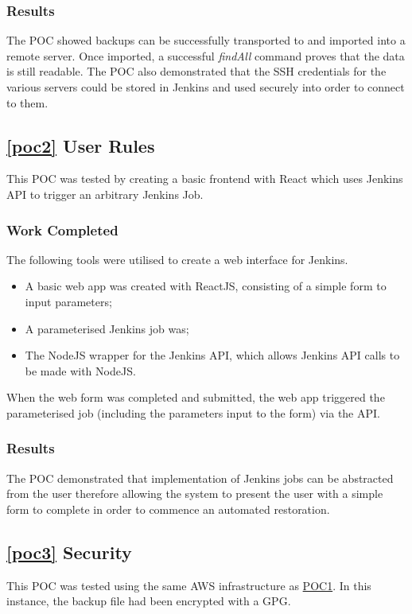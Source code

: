 	\subsubsection{Results}
  The POC showed backups can be successfully transported to and imported into a remote server. Once imported, a successful \textit{findAll} command proves that the data is still readable. The POC also demonstrated that the SSH credentials for the various servers could be stored in Jenkins and used securely into order to connect to them.
  
\subsection{\ref{poc2} User Rules}
	This POC was tested by creating a basic frontend with React which uses Jenkins API to trigger an arbitrary Jenkins Job.
	
	\subsubsection{Work Completed}
  The following tools were utilised to create a web interface for Jenkins.
  \begin{itemize}
    \item A basic web app was created with ReactJS, consisting of a simple form to input parameters;
    \item A parameterised Jenkins job was;
    \item The NodeJS wrapper for the Jenkins API, which allows Jenkins API calls to be made with NodeJS.
  \end{itemize}
  When the web form was completed and submitted, the web app triggered the parameterised job (including the parameters input to the form) via the API.

  \subsubsection{Results}
  The POC demonstrated that implementation of Jenkins jobs can be abstracted from the user therefore allowing the system to present the user with a simple form to complete in order to commence an automated restoration.

\subsection{\ref{poc3} Security}
  This POC was tested using the same AWS infrastructure as \hyperref[poc1]{POC1}. In this instance, the backup file had been encrypted with a GPG.

